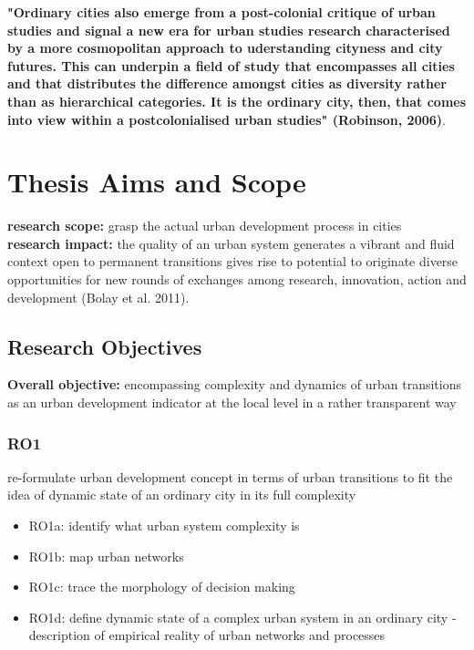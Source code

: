 \documentclass[11pt]{report}
\begin{document}
\textbf{"Ordinary cities also emerge from a post-colonial critique of urban studies and signal a new era for urban studies research characterised by a more cosmopolitan approach to uderstanding cityness and city futures. This can underpin a field of study that encompasses all cities and that distributes the difference amongst cities as diversity rather than as hierarchical categories. It is the ordinary city, then, that comes into view within a postcolonialised urban studies" (Robinson, 2006)}.

\section{Thesis Aims and Scope}
\textbf{research scope:} grasp the actual urban development process in cities
\\
\textbf{research impact:} the quality of an urban system generates a vibrant and fluid context open to permanent transitions gives rise to potential to originate diverse opportunities for new rounds of exchanges among research, innovation, action and development (Bolay et al. 2011).

\subsection{Research Objectives}
\textbf{Overall objective:} encompassing complexity and dynamics of urban transitions as an urban development indicator at the local level in a rather transparent way
\\

\subsubsection{RO1}
re-formulate urban development concept in terms of urban transitions to fit the idea of dynamic state of an ordinary city in its full complexity
\begin{itemize}
\item RO1a: identify what urban system complexity is  
\item RO1b: map  urban networks
\item RO1c: trace the morphology of decision making 
\item RO1d: define dynamic state of a complex urban system in an ordinary city - description of empirical reality of urban networks and processes
\end{itemize}
\end{document}
